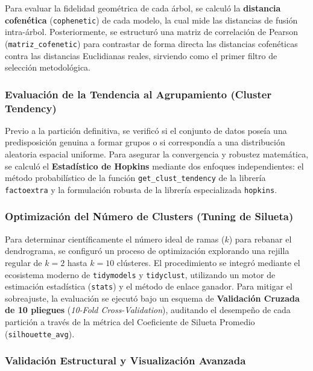 \documentclass[
  10pt,
  a4paper]{article}
\begin{document}
Para evaluar la fidelidad geométrica de cada árbol, se calculó la \textbf{distancia cofenética} (\texttt{cophenetic}) de cada modelo, la cual mide las distancias de fusión intra-árbol. Posteriormente, se estructuró una matriz de correlación de Pearson (\texttt{matriz\_cofenetic}) para contrastar de forma directa las distancias cofenéticas contra las distancias Euclidianas reales, sirviendo como el primer filtro de selección metodológica.

\subsubsection{Evaluación de la Tendencia al Agrupamiento (Cluster Tendency)}\label{evaluaciuxf3n-de-la-tendencia-al-agrupamiento-cluster-tendency}

Previo a la partición definitiva, se verificó si el conjunto de datos poseía una predisposición genuina a formar grupos o si correspondía a una distribución aleatoria espacial uniforme. Para asegurar la convergencia y robustez matemática, se calculó el \textbf{Estadístico de Hopkins} mediante dos enfoques independientes: el método probabilístico de la función \texttt{get\_clust\_tendency} de la librería \texttt{factoextra} y la formulación robusta de la librería especializada \texttt{hopkins}.

\subsubsection{Optimización del Número de Clusters (Tuning de Silueta)}\label{optimizaciuxf3n-del-nuxfamero-de-clusters-tuning-de-silueta}

Para determinar científicamente el número ideal de ramas (\(k\)) para rebanar el dendrograma, se configuró un proceso de optimización explorando una rejilla regular de \(k = 2\) hasta \(k = 10\) clústeres. El procedimiento se integró mediante el ecosistema moderno de \texttt{tidymodels} y \texttt{tidyclust}, utilizando un motor de estimación estadística (\texttt{stats}) y el método de enlace ganador. Para mitigar el sobreajuste, la evaluación se ejecutó bajo un esquema de \textbf{Validación Cruzada de 10 pliegues} (\emph{10-Fold Cross-Validation}), auditando el desempeño de cada partición a través de la métrica del Coeficiente de Silueta Promedio (\texttt{silhouette\_avg}).

\subsubsection{Validación Estructural y Visualización Avanzada}\label{validaciuxf3n-estructural-y-visualizaciuxf3n-avanzada}
\end{document}
